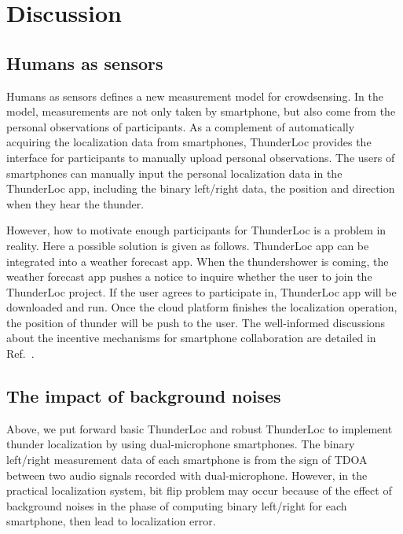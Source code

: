 \section{Discussion}

\subsection{Humans as sensors}

Humans as sensors deﬁnes a new measurement model for crowdsensing. In the model, measurements are
not only taken by smartphone, but also come from the personal observations of participants. 
As a complement of automatically acquiring the localization data from smartphones, ThunderLoc provides the interface for participants to manually upload personal observations.
The users of smartphones can manually input the personal localization data in the ThunderLoc app, 
including the binary left/right data, the position and direction when they hear the thunder.

However, how to motivate enough participants for ThunderLoc is a problem in reality. 
Here a possible solution is given as follows. ThunderLoc app can be integrated into a weather forecast app. When the thundershower is coming, 
the weather forecast app pushes a notice to inquire whether the user to join the ThunderLoc project. 
If the user agrees to participate in, ThunderLoc app will be downloaded and run. Once the cloud platform finishes the localization operation,
the position of thunder will be push to the user. 
The well-informed discussions about the incentive mechanisms for smartphone collaboration are detailed in Ref.~\cite{duan2012incentive}.


\subsection{The impact of background noises}
Above, we put forward basic ThunderLoc and robust ThunderLoc to implement thunder localization by using dual-microphone smartphones.
The binary left/right measurement data of each smartphone is from the sign of TDOA between two audio signals recorded with dual-microphone. 
However, in the practical localization system, bit flip problem may occur because of the effect of background noises in the phase of computing binary left/right for each smartphone,
then lead to localization error.



